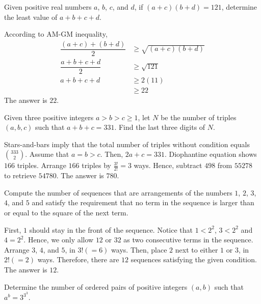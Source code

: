 \begin{problem}
Given positive real numbers $a$, $b$, $c$, and $d$, if $(a+c)(b+d)=121$, determine the least value of $a+b+c+d$.
\end{problem}

\begin{solution}
According to AM-GM inequality, 
\begin{align*}
    \dfrac{(a+c)+(b+d)}{2} & \geq \sqrt{(a+c)(b+d)}\\
    \dfrac{a+b+c+d}{2} & \geq \sqrt{121}\\
    a+b+c+d &\geq 2(11)\\
    &\geq 22
\end{align*}
The answer is $22$.
\end{solution}

\begin{problem}
Given three positive integers $a>b>c\geq1$, let $N$ be the number of triples $(a,b,c)$ such that $a+b+c=331$. Find the last three digits of $N$.
\end{problem}

\begin{solution}
Stars-and-bars imply that the total number of triples without condition equals $\binom{333}{2}$. Assume that $a=b>c$. Then, $2a+c=331$. Diophantine equation shows $166$ triples. Arrange $166$ triples by $\frac{3!}{2!}=3$ ways. Hence, subtract $498$ from $55278$ to retrieve $54780$. The answer is $780$.
\end{solution}

\begin{problem}
Compute the number of sequences that are arrangements of the numbers $1$, $2$, $3$, $4$, and $5$ and satisfy the requirement that no term in the sequence is larger than or equal to the square of the next term.
\end{problem}

\begin{solution}
First, $1$ should stay in the front of the sequence. Notice that $1<2^2$, $3<2^2$ and $4=2^2$. Hence, we only allow $12$ or $32$ as two consecutive terms in the sequence. Arrange $3$, $4$, and $5$, in $3!(=6)$ ways. Then, place $2$ next to either $1$ or $3$, in $2!(=2)$ ways. Therefore, there are $12$ sequences satisfying the given condition. The answer is $12$.
\end{solution}

\begin{problem}
Determine the number of ordered pairs of positive integers $(a,b)$ such that $a^b=3^{3^3}$.
\end{problem}


